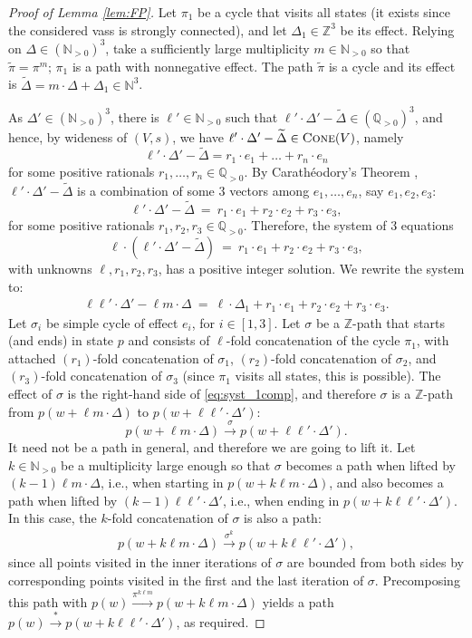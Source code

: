 \documentclass[a4paper, UKenglish, cleveref, autoref, thm-restate]{lipics-v2021}
\newcommand{\N}{\mathbb{N}}
\newcommand{\Z}{\mathbb{Z}}
\newcommand{\Q}{\mathbb{Q}}
\newcommand{\Qpos}{\Q_{>0}}
\newcommand{\trans}[1]{\stackrel{#1}{\longrightarrow}}
\newcommand{\tran}{\trans{*}}
\newcommand{\vass}{{\sc vass}\xspace}
\newcommand{\setfromto}[2]{[#1, #2]}
\newcommand{\setto}[1]{\setfromto 1 {#1}}
\newcommand{\cone}[1]{\textsc{Cone}(#1)}
\newcommand{\Npos}{\N_{>0}}
\begin{document}
\begin{proof}[Proof of Lemma \ref{lem:FP}]
Let $\pi_1$ be a cycle that visits all states (it exists since the considered \vass is strongly connected), and
let $\Delta_1\in\Z^3$ be its effect.
Relying on $\Delta\in(\Npos)^3$,
take a sufficiently large multiplicity $m\in\Npos$ so that 
$\widetilde \pi = \pi^m;\, \pi_1$ is a path with nonnegative effect.
The path $\widetilde \pi$ is a cycle and  its effect is
$\widetilde \Delta = m\cdot\Delta + \Delta_1 \in \N^3$.


As $\Delta'\in(\Npos)^3$, there is $\ell'\in\Npos$ such that 
$\ell'\cdot\Delta'-\widetilde \Delta \in (\Qpos)^3$,
and hence, by wideness of $(V, s)$, we have
$\ell'\cdot\Delta'-\widetilde \Delta \in \cone V$, namely
\[
\ell'\cdot\Delta' - \widetilde \Delta = r_1 \cdot e_1 + \ldots + r_n \cdot e_n
\] 
for some positive rationals $r_1, \ldots, r_n\in \Qpos$.
By Carathéodory's Theorem \cite[p.94]{cara}, $\ell'\cdot\Delta'-\widetilde \Delta$ is a combination of some $3$ vectors
among $e_1, \ldots, e_n$, say $e_1, e_2, e_3$:
\[
\ell'\cdot\Delta' - \widetilde \Delta \ = \ r_1 \cdot e_1 + r_2 \cdot e_2 + r_3 \cdot e_3,
\] 
for some positive rationals $r_1, r_2, r_3\in\Qpos$.
Therefore, the system of $3$ equations
\[
\ell \cdot (\ell'\cdot\Delta'-\widetilde\Delta)  \ = \ r_1 \cdot e_1 + r_2 \cdot e_2 + r_3 \cdot e_3,
\]
with unknowns $\ell, r_1, r_2, r_3$, has a positive integer solution.
We rewrite the system to:
\begin{align} \label{eq:syst_1comp}
\ell \ell'\cdot \Delta' - \ell m \cdot \Delta \ = \  \ell\cdot\Delta_1 + r_1 \cdot e_1 + r_2 \cdot e_2 + r_3 \cdot e_3.
\end{align}
Let $\sigma_i$ be simple cycle of effect $e_i$, for $i\in\setto 3$.
Let $
\sigma
$
be a $\Z$-path that starts (and ends) in state $p$ and consists of 
$\ell$-fold concatenation of the cycle $\pi_1$, with attached 
$(r_1)$-fold concatenation of $\sigma_1$,
$(r_2)$-fold concatenation of $\sigma_2$,
and
$(r_3)$-fold concatenation of $\sigma_3$
(since $\pi_1$ visits all states, this is possible).
The effect of $\sigma$ is the right-hand side of \eqref{eq:syst_1comp}, and therefore
$\sigma$ is a $\Z$-path from $p(w+\ell m \cdot \Delta)$ to
$p(w + \ell \ell'\cdot \Delta')$:
\[
p(w + \ell m \cdot \Delta) \trans{\sigma} p(w+\ell \ell'\cdot \Delta').
\]
It need not be a path in general, and therefore we are going to lift it.
Let $k\in\Npos$ be a multiplicity large enough so that $\sigma$ becomes a path
when lifted by $(k-1)\ell m \cdot \Delta$, i.e., when starting in $p(w+k \ell m \cdot \Delta)$, 
and also becomes a path when lifted by $(k-1)\ell\ell'\cdot \Delta'$, i.e., when
ending in 
$p(w+k \ell\ell' \cdot \Delta')$.
In this case, the $k$-fold concatenation of $\sigma$ is also a path:
\begin{align} \label{eq:thepath}
p(w+k\ell m\cdot \Delta) \trans{\sigma^{k}} 
p(w+k \ell\ell'\cdot \Delta'),
\end{align}
since all points visited in the inner iterations of $\sigma$ are bounded 
from both sides by corresponding points visited in the first and the last iteration of $\sigma$.
Precomposing this path with $p(w)\trans{\pi^{k\ell m}} p(w + k\ell m\cdot \Delta)$ yields a path
$p(w) \tran p(w+ k \ell \ell'\cdot \Delta')$, as required.


\end{proof}
\end{document}
